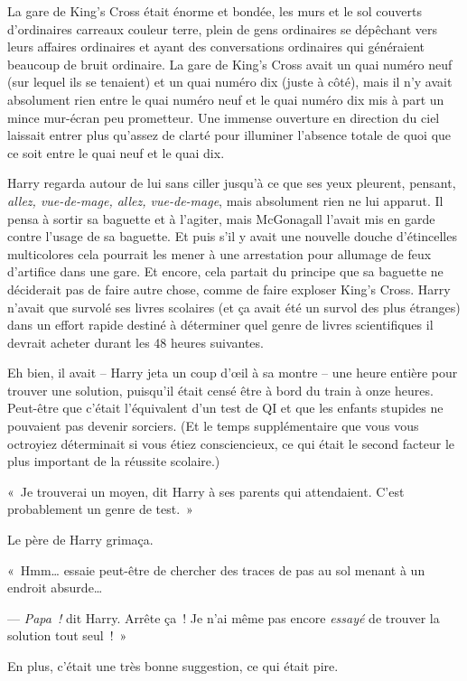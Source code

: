La gare de King's Cross était énorme et bondée, les murs et le sol couverts d'ordinaires carreaux couleur terre, plein de gens ordinaires se dépêchant vers leurs affaires ordinaires et ayant des conversations ordinaires qui généraient beaucoup de bruit ordinaire. La gare de King's Cross avait un quai numéro neuf (sur lequel ils se tenaient) et un quai numéro dix (juste à côté), mais il n'y avait absolument rien entre le quai numéro neuf et le quai numéro dix mis à part un mince mur-écran peu prometteur. Une immense ouverture en direction du ciel laissait entrer plus qu'assez de clarté pour illuminer l'absence totale de quoi que ce soit entre le quai neuf et le quai dix.

Harry regarda autour de lui sans ciller jusqu'à ce que ses yeux pleurent, pensant, \emph{allez, vue-de-mage, allez, vue-de-mage}, mais absolument rien ne lui apparut. Il pensa à sortir sa baguette et à l'agiter, mais McGonagall l'avait mis en garde contre l'usage de sa baguette. Et puis s'il y avait une nouvelle douche d'étincelles multicolores cela pourrait les mener à une arrestation pour allumage de feux d'artifice dans une gare. Et encore, cela partait du principe que sa baguette ne déciderait pas de faire autre chose, comme de faire exploser King's Cross. Harry n'avait que survolé ses livres scolaires (et ça avait été un survol des plus étranges) dans un effort rapide destiné à déterminer quel genre de livres scientifiques il devrait acheter durant les 48 heures suivantes.

Eh bien, il avait -- Harry jeta un coup d'œil à sa montre -- une heure entière pour trouver une solution, puisqu'il était censé être à bord du train à onze heures. Peut-être que c'était l'équivalent d'un test de QI et que les enfants stupides ne pouvaient pas devenir sorciers. (Et le temps supplémentaire que vous vous octroyiez déterminait si vous étiez consciencieux, ce qui était le second facteur le plus important de la réussite scolaire.)

«~Je trouverai un moyen, dit Harry à ses parents qui attendaient. C'est probablement un genre de test.~»

Le père de Harry grimaça.

«~Hmm… essaie peut-être de chercher des traces de pas au sol menant à un endroit absurde…

--- \emph{Papa~!} dit Harry. Arrête ça~! Je n'ai même pas encore \emph{essayé} de trouver la solution tout seul~!~»

En plus, c'était une très bonne suggestion, ce qui était pire.

